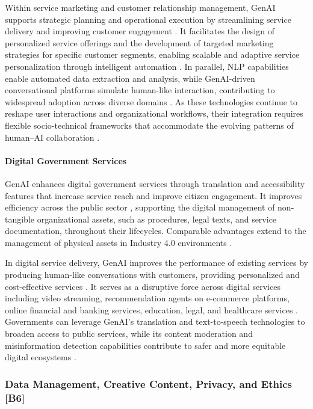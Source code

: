 Within service marketing and customer relationship management, GenAI supports strategic planning and operational execution by streamlining service delivery and improving customer engagement \parencite{R08}. It facilitates the design of personalized service offerings and the development of targeted marketing strategies for specific customer segments, enabling scalable and adaptive service personalization through intelligent automation \parencite{R08}. In parallel, NLP capabilities enable automated data extraction and analysis, while GenAI-driven conversational platforms simulate human-like interaction, contributing to widespread adoption across diverse domains \parencite{S10}. As these technologies continue to reshape user interactions and organizational workflows, their integration requires flexible socio-technical frameworks that accommodate the evolving patterns of human–AI collaboration \parencite{S13}.

\paragraph{Digital Government Services}

GenAI enhances digital government services through translation and accessibility features that increase service reach and improve citizen engagement. It improves efficiency across the public sector \parencite{R03}, supporting the digital management of non-tangible organizational assets, such as procedures, legal texts, and service documentation, throughout their lifecycles. Comparable advantages extend to the management of physical assets in Industry 4.0 environments \parencite{R04}.

In digital service delivery, GenAI improves the performance of existing services by producing human-like conversations with customers, providing personalized and cost-effective services \parencite{R08}. It serves as a disruptive force across digital services including video streaming, recommendation agents on e-commerce platforms, online financial and banking services, education, legal, and healthcare services \parencite{R08}. Governments can leverage GenAI’s translation and text-to-speech technologies to broaden access to public services, while its content moderation and misinformation detection capabilities contribute to safer and more equitable digital ecosystems \parencite{R08}.

\subsubsection{Data Management, Creative Content, Privacy, and Ethics [B6]}
